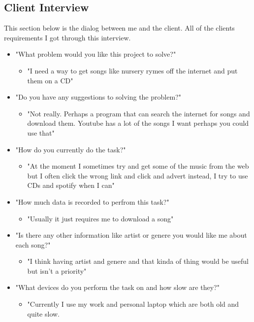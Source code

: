 \documentclass{article}
\begin{document}
\subsection{Client Interview}\label{ClientInterview}
This section below is the dialog between me and the client. All of the clients requirements I got through this
interview.
\begin{itemize}
    \item "What problem would you like this project to solve?"
    \begin{itemize}
        \item "I need a way to get songs like nursery rymes off the internet and put them on a CD"
    \end{itemize}
    \item "Do you have any suggestions to solving the problem?"
    \begin{itemize}
        \item "Not really. Perhaps a program that can search the internet for songs and download them.
            Youtube has a lot of the songs I want perhaps you could use that"
    \end{itemize}
    \item "How do you currently do the task?"
    \begin{itemize}
        \item "At the moment I sometimes try and get some of the music from the web but I often click the wrong
            link and click and advert instead, I try to use CDs and spotify when I can"
    \end{itemize}
    \item "How much data is recorded to perfrom this task?"
    \begin{itemize}
        \item "Usually it just requires me to download a song"
    \end{itemize}
    \item "Is there any other information like artist or genere you would like me about each song?"
    \begin{itemize}
        \item "I think having artist and genere and that kinda of thing would be useful but isn't a priority"
    \end{itemize}
    \item "What devices do you perform the task on and how slow are they?"
    \begin{itemize}
        \item "Currently I use my work and personal laptop which are both old and quite slow.

\end{itemize}
\end{itemize}
\end{document}
